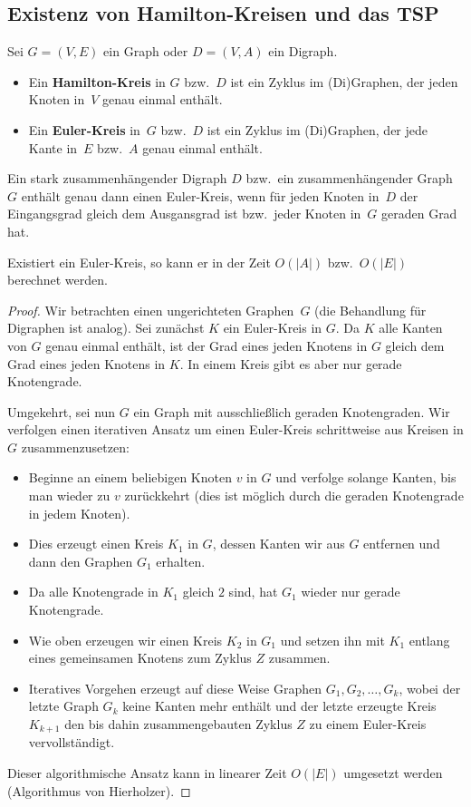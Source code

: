 \condclearpage
\subsection{Existenz von Hamilton-Kreisen und das TSP}

\begin{defn}
Sei $G = (V,E)$ ein Graph oder $D = (V,A)$ ein Digraph.
\begin{itemize}
 \item Ein \textbf{Hamilton-Kreis} in $G$ bzw.~$D$ ist ein Zyklus im (Di)Graphen, der jeden Knoten in~$V$ genau einmal enthält.
 \item Ein \textbf{Euler-Kreis} in~$G$ bzw.~$D$ ist ein Zyklus im (Di)Graphen, der jede Kante in~$E$ bzw.~$A$ genau einmal enthält.
\end{itemize}
\end{defn}

\begin{lem}
\label{lem:existenz-euler-kreis}
Ein stark zusammenhängender Digraph $D$ bzw.~ein zusammenhängender Graph~$G$ enthält genau dann einen Euler-Kreis, wenn für jeden Knoten in~$D$ der Eingangsgrad gleich dem Ausgansgrad ist bzw.~jeder Knoten in~$G$ geraden Grad hat.

Existiert ein Euler-Kreis, so kann er in der Zeit $O(|A|)$ bzw.~$O(|E|)$ berechnet werden.
\end{lem}
\begin{proof}
Wir betrachten einen ungerichteten Graphen~$G$ (die Behandlung für Digraphen ist analog).
Sei zunächst $K$ ein Euler-Kreis in $G$. Da $K$ alle Kanten von $G$ genau einmal enthält, ist der Grad eines jeden Knotens in $G$ gleich dem Grad eines jeden Knotens in $K$.
In einem Kreis gibt es aber nur gerade Knotengrade.

Umgekehrt, sei nun $G$ ein Graph mit ausschlie\ss lich geraden Knotengraden.
Wir verfolgen einen iterativen Ansatz um einen Euler-Kreis schrittweise aus Kreisen in $G$ zusammenzusetzen:
\begin{itemize}
 \item Beginne an einem beliebigen Knoten $v$ in $G$ und verfolge solange Kanten, bis man wieder zu $v$ zurückkehrt (dies ist möglich durch die geraden Knotengrade in jedem Knoten).
 \item Dies erzeugt einen Kreis $K_1$ in $G$, dessen Kanten wir aus $G$ entfernen und dann den Graphen $G_1$ erhalten.
 \item Da alle Knotengrade in $K_1$ gleich $2$ sind, hat $G_1$ wieder nur gerade Knotengrade.
 \item Wie oben erzeugen wir einen Kreis $K_2$ in $G_1$ und setzen ihn mit $K_1$ entlang eines gemeinsamen Knotens zum Zyklus $Z$ zusammen.
 \item Iteratives Vorgehen erzeugt auf diese Weise Graphen $G_1,G_2,\ldots,G_k$, wobei der letzte Graph $G_k$ keine Kanten mehr enthält und der letzte erzeugte Kreis $K_{k+1}$ den bis dahin zusammengebauten Zyklus $Z$ zu einem Euler-Kreis vervollständigt.
\end{itemize}
%
Dieser algorithmische Ansatz kann in linearer Zeit $O(|E|)$ umgesetzt werden (Algorithmus von Hierholzer).
\end{proof}

